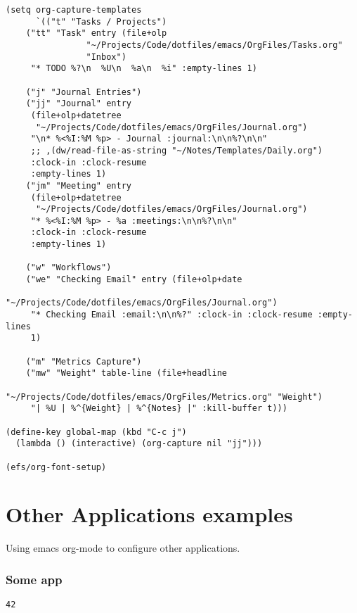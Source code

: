 \documentclass[11pt]{article}
\begin{document}
\begin{verbatim}
(setq org-capture-templates
      `(("t" "Tasks / Projects")
	("tt" "Task" entry (file+olp
			    "~/Projects/Code/dotfiles/emacs/OrgFiles/Tasks.org"
			    "Inbox")
	 "* TODO %?\n  %U\n  %a\n  %i" :empty-lines 1)

	("j" "Journal Entries")
	("jj" "Journal" entry
	 (file+olp+datetree
	  "~/Projects/Code/dotfiles/emacs/OrgFiles/Journal.org")
	 "\n* %<%I:%M %p> - Journal :journal:\n\n%?\n\n"
	 ;; ,(dw/read-file-as-string "~/Notes/Templates/Daily.org")
	 :clock-in :clock-resume
	 :empty-lines 1)
	("jm" "Meeting" entry
	 (file+olp+datetree
	  "~/Projects/Code/dotfiles/emacs/OrgFiles/Journal.org")
	 "* %<%I:%M %p> - %a :meetings:\n\n%?\n\n"
	 :clock-in :clock-resume
	 :empty-lines 1)

	("w" "Workflows")
	("we" "Checking Email" entry (file+olp+date
				      "~/Projects/Code/dotfiles/emacs/OrgFiles/Journal.org")
	 "* Checking Email :email:\n\n%?" :clock-in :clock-resume :empty-lines
	 1)

	("m" "Metrics Capture")
	("mw" "Weight" table-line (file+headline
				   "~/Projects/Code/dotfiles/emacs/OrgFiles/Metrics.org" "Weight")
	 "| %U | %^{Weight} | %^{Notes} |" :kill-buffer t)))

(define-key global-map (kbd "C-c j")
  (lambda () (interactive) (org-capture nil "jj")))

(efs/org-font-setup)

\end{verbatim}

\section{Other Applications examples}
\label{sec:org8cb243f}

Using emacs org-mode to configure other applications.

\subsubsection{Some app}
\label{sec:orga380ba4}

\begin{verbatim}
42
\end{verbatim}
\end{document}

